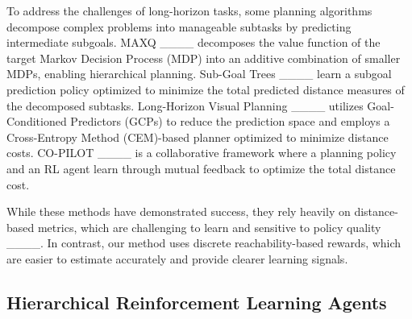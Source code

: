 To address the challenges of long-horizon tasks, some planning algorithms decompose complex problems into manageable subtasks by predicting intermediate subgoals.
MAXQ ____ decomposes the value function of the target Markov Decision Process (MDP) into an additive combination of smaller MDPs, enabling hierarchical planning.
Sub-Goal Trees ____ learn a subgoal prediction policy optimized to minimize the total predicted distance measures of the decomposed subtasks.
Long-Horizon Visual Planning ____ utilizes Goal-Conditioned Predictors (GCPs) to reduce the prediction space and employs a Cross-Entropy Method (CEM)-based planner optimized to minimize distance costs.
CO-PILOT ____ is a collaborative framework where a planning policy and an RL agent learn through mutual feedback to optimize the total distance cost.

While these methods have demonstrated success, they rely heavily on distance-based metrics, which are challenging to learn and sensitive to policy quality ____.
In contrast, our method uses discrete reachability-based rewards, which are easier to estimate accurately and provide clearer learning signals.


\subsection{Hierarchical Reinforcement Learning Agents}


